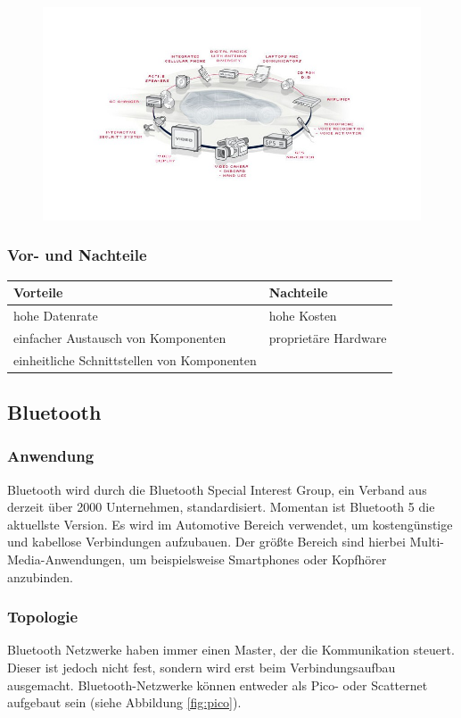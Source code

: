 \begin{figure}[h!]
	\includegraphics[width=\linewidth]{most-ring.jpg}
	\label{fig:ring}
\end{figure}

\subsubsection{Vor- und Nachteile}
\begin{tabular}{l|l}
	\textbf{Vorteile} & \textbf{Nachteile}\\
	\hline hohe Datenrate & hohe Kosten\\
	\hline einfacher Austausch von Komponenten & proprietäre Hardware\\
	\hline einheitliche Schnittstellen von Komponenten &\\
\end{tabular}

\subsection{Bluetooth}		
\subsubsection{Anwendung}
Bluetooth wird durch die Bluetooth Special Interest Group, ein Verband aus derzeit über 2000 Unternehmen,  standardisiert. Momentan ist Bluetooth 5 die aktuellste Version. Es wird im Automotive Bereich verwendet, um kostengünstige und kabellose Verbindungen aufzubauen. Der größte Bereich sind hierbei Multi-Media-Anwendungen, um beispielsweise Smartphones oder Kopfhörer anzubinden. \cite{BP01}

\subsubsection{Topologie}
Bluetooth Netzwerke haben immer einen Master, der die Kommunikation steuert. Dieser ist jedoch nicht fest, sondern wird erst beim Verbindungsaufbau ausgemacht.
Bluetooth-Netzwerke können entweder als Pico- oder Scatternet aufgebaut sein (siehe Abbildung \ref{fig:pico}).
                                                                                  
